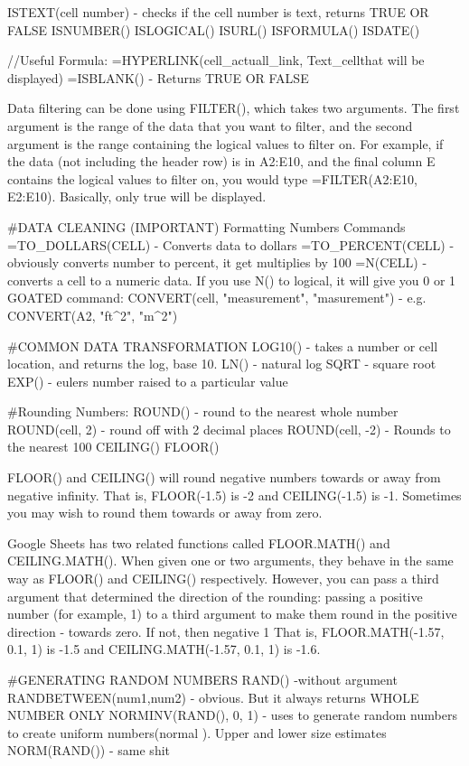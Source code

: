 ISTEXT(cell number) - checks if the cell number is text, returns TRUE OR FALSE
ISNUMBER()
ISLOGICAL()
ISURL()
ISFORMULA()
ISDATE()

//Useful Formula:
=HYPERLINK(cell_actuall_link, Text_cellthat will be displayed)
=ISBLANK() - Returns TRUE OR FALSE 

Data filtering can be done using FILTER(), 
which takes two arguments. The first argument
is the range of the data that you want to filter,
and the second argument is the range containing the logical values to filter on.
For example, if the data (not including the header row) is in A2:E10,
and the final column E contains the logical values to filter on,
you would type =FILTER(A2:E10, E2:E10). Basically, only true will be displayed.

#DATA CLEANING (IMPORTANT)
Formatting Numbers Commands
=TO_DOLLARS(CELL) - Converts data to dollars
=TO_PERCENT(CELL) - obviously converts number to percent, it get multiplies by 100
=N(CELL) - converts a cell to a numeric data. If you use N() to logical, it will give you 0 or 1
GOATED command:
CONVERT(cell, "measurement", "masurement") - e.g. CONVERT(A2, "ft^2", "m^2") 

#COMMON DATA TRANSFORMATION
LOG10() - takes a number or cell location, and returns the log, base 10.
LN() - natural log
SQRT - square root
EXP() - eulers number raised to a particular value


#Rounding Numbers:
ROUND()  - round to the nearest whole number
ROUND(cell, 2) - round off with 2 decimal places
ROUND(cell, -2) - Rounds to the nearest 100
CEILING()
FLOOR() 

FLOOR() and CEILING() will round negative numbers towards or away from negative infinity.
That is, FLOOR(-1.5) is -2 and CEILING(-1.5) is -1.
Sometimes you may wish to round them towards or away from zero.

Google Sheets has two related functions called FLOOR.MATH() 
and CEILING.MATH(). When given one or two arguments, 
they behave in the same way as FLOOR() and CEILING() respectively.
However, you can pass a third argument that determined the direction
of the rounding: passing a positive number (for example, 1) to a third argument 
to make them round in the positive direction - towards zero. If not, then negative 1
That is, FLOOR.MATH(-1.57, 0.1, 1) is -1.5 and CEILING.MATH(-1.57, 0.1, 1) is -1.6.


#GENERATING RANDOM NUMBERS
RAND() -without argument
RANDBETWEEN(num1,num2) - obvious. But it always returns WHOLE NUMBER ONLY
NORMINV(RAND(), 0, 1) - uses to generate random numbers to create uniform numbers(normal ). Upper and lower size estimates
NORM(RAND()) - same shit


